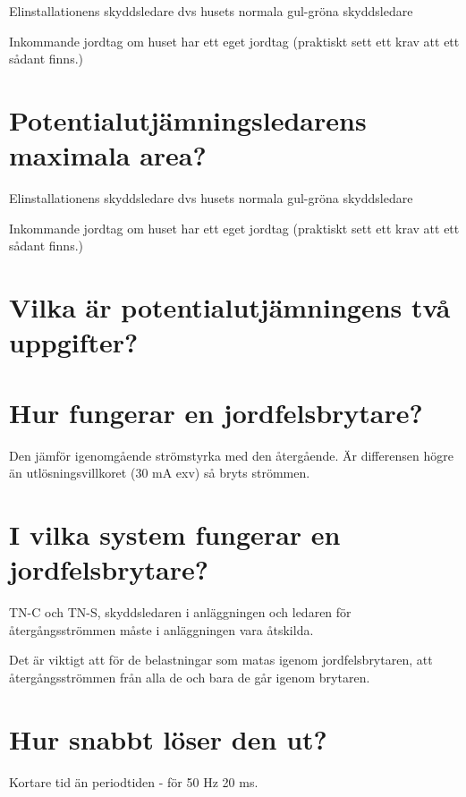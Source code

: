 \documentclass[a4paper,swedish]{article}
\begin{document}
Elinstallationens skyddsledare dvs husets normala gul-gröna skyddsledare

Inkommande jordtag om huset har ett eget jordtag (praktiskt sett ett krav att ett sådant finns.)

\setcounter{section}{23}
\section{Potentialutjämningsledarens maximala area?}\label{sec:potentialutjamningarea}

Elinstallationens skyddsledare dvs husets normala gul-gröna skyddsledare

Inkommande jordtag om huset har ett eget jordtag (praktiskt sett ett krav att ett sådant finns.)

\setcounter{section}{25}
\section{Vilka är potentialutjämningens två uppgifter?}\label{sec:potentialutjamningsuppgifter}

\setcounter{section}{27}
\section{Hur fungerar en jordfelsbrytare?}\label{sec:RCD_working}

Den jämför igenomgående strömstyrka med den återgående. Är differensen högre än utlösningsvillkoret
(30 mA exv) så bryts strömmen.

\setcounter{section}{29}
\section{I vilka system fungerar en jordfelsbrytare?}\label{sec:RCD_systems}

TN-C och TN-S, skyddsledaren i anläggningen och ledaren för återgångsströmmen måste i anläggningen vara åtskilda.

Det är viktigt att för de belastningar som matas igenom jordfelsbrytaren, att återgångsströmmen från alla de och
bara de går igenom brytaren.

\setcounter{section}{31}
\section{Hur snabbt löser den ut?}\label{sec:RCD_how_fast}

Kortare tid än periodtiden - för 50 Hz  20 ms.
\end{document}
